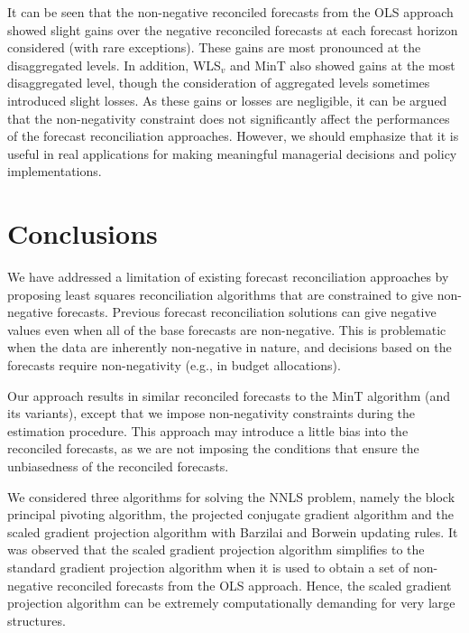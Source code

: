 \documentclass[twocolumn]{svjour3}
\begin{document}
It can be seen that the non-negative reconciled forecasts from the OLS approach showed slight gains over the negative reconciled forecasts at each forecast horizon considered (with rare exceptions). These gains are most pronounced at the disaggregated levels. In addition, WLS$_{v}$ and MinT also showed gains at the most disaggregated level, though the consideration of aggregated levels sometimes introduced slight losses. As these gains or losses are negligible, it can be argued that the non-negativity constraint does not significantly affect the performances of the forecast reconciliation approaches. However, we should emphasize that it is useful in real applications for making meaningful managerial decisions and policy implementations.

\section{Conclusions}

We have addressed a limitation of existing forecast reconciliation approaches by proposing least squares reconciliation algorithms that are constrained to give non-negative forecasts. Previous forecast reconciliation solutions can give negative values even when all of the base forecasts are non-negative. This is problematic when the data are inherently non-negative in nature, and decisions based on the forecasts require non-negativity (e.g., in budget allocations).

Our approach results in similar reconciled forecasts to the MinT algorithm (and its variants), except that we impose non-negativity constraints during the estimation procedure. This approach may introduce a little bias into the reconciled forecasts, as we are not imposing the conditions that ensure the unbiasedness of the reconciled forecasts.

We considered three algorithms for solving the NNLS problem, namely the block principal pivoting algorithm, the projected conjugate gradient algorithm and the scaled gradient projection algorithm with Barzilai and Borwein updating rules. It was observed that the scaled gradient projection algorithm simplifies to the standard gradient projection algorithm when it is used to obtain a set of non-negative reconciled forecasts from the OLS approach. Hence, the scaled gradient projection algorithm can be extremely computationally demanding for very large structures.
\end{document}
